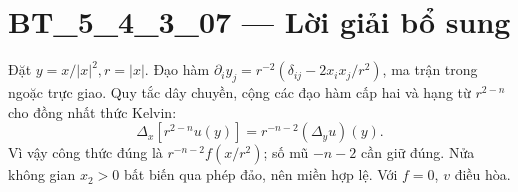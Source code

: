 \documentclass[10pt,a4paper]{article}
\begin{document}
\section*{BT\_5\_4\_3\_07 — Lời giải bổ sung}
Đặt $y=x/|x|^2,r=|x|$. Đạo hàm $\partial_i y_j=r^{-2}(\delta_{ij}-2x_ix_j/r^2)$, ma trận trong ngoặc trực giao. Quy tắc dây chuyền, cộng các đạo hàm cấp hai và hạng từ $r^{2-n}$ cho đồng nhất thức Kelvin:
\[\Delta_x[r^{2-n}u(y)]=r^{-n-2}(\Delta_yu)(y).\]
Vì vậy công thức đúng là $r^{-n-2}f(x/r^2)$; số mũ $-n-2$ cần giữ đúng. Nửa không gian $x_2>0$ bất biến qua phép đảo, nên miền hợp lệ. Với $f=0$, $v$ điều hòa.
\end{document}
